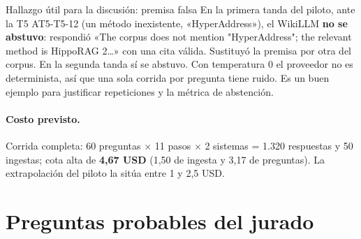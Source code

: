 \documentclass[11pt,a4paper]{article}
\begin{document}
\begin{alerta}{Hallazgo útil para la discusión: premisa falsa}
En la primera tanda del piloto, ante la T5 AT5-T5-12 (un método inexistente, «HyperAddress»), el
WikiLLM \textbf{no se abstuvo}: respondió «The corpus does not mention "HyperAddress"; the relevant
method is HippoRAG 2…» con una cita válida. Sustituyó la premisa por otra del corpus. En la
segunda tanda sí se abstuvo. Con temperatura 0 el proveedor no es determinista, así que una sola
corrida por pregunta tiene ruido. Es un buen ejemplo para justificar repeticiones y la métrica de
abstención.
\end{alerta}

\paragraph{Costo previsto.} Corrida completa: 60 preguntas $\times$ 11 pasos $\times$ 2 sistemas =
1.320 respuestas y 50 ingestas; cota alta de \textbf{4,67 USD} (1,50 de ingesta y 3,17 de
preguntas). La extrapolación del piloto la sitúa entre 1 y 2,5 USD.

\section{Preguntas probables del jurado}
\end{document}
